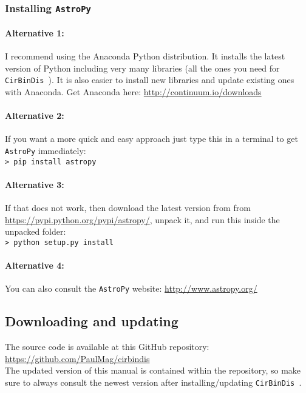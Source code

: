 \documentclass[a4paper, 12pt, english, titlepage]{article}
\newcommand{\sname}{\texttt{CirBinDis }}
\begin{document}
    \subsubsection{Installing \texttt{AstroPy}}
        \paragraph{Alternative 1:}
        I recommend using the Anaconda Python distribution. It installs the latest version of Python including very many libraries (all the ones you need for \sname). It is also easier to install new libraries and update existing ones with Anaconda. 
        Get Anaconda here: \url{http://continuum.io/downloads}

        \paragraph{Alternative 2:}
        If you want a more quick and easy approach just type this in a terminal to get \texttt{AstroPy} immediately: \\
        \texttt{> pip install astropy}

        \paragraph{Alternative 3:}
        If that does not work, then download the latest version from from \url{https://pypi.python.org/pypi/astropy/}, unpack it, and run this inside the unpacked folder: \\
        \texttt{> python setup.py install}

        \paragraph{Alternative 4:}
        You can also consult the \texttt{AstroPy} website: 
        \url{http://www.astropy.org/}


\subsection{Downloading and updating}
    \label{sec:downloading}

    The source code is available at this GitHub repository: \\
    \url{https://github.com/PaulMag/cirbindis} \\
    The updated version of this manual is contained within the repository, so make sure to always consult the newest version after installing/updating \sname. 
\end{document}

